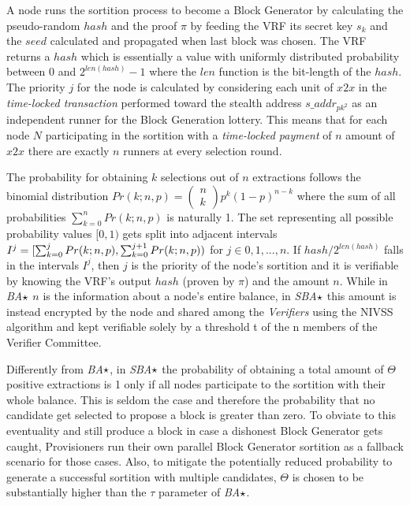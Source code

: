 A node runs the sortition process to become a Block Generator by
calculating the pseudo-random \(hash\) and the proof \(\pi\) by feeding
the VRF its secret key \(s_k\) and the \(seed\) calculated and
propagated when last block was chosen. The VRF returns a \(hash\) which
is essentially a value with uniformly distributed probability between 0
and \(2^{len(hash)} - 1\) where the \(len\) function is the bit-length
of the \(hash\). The priority \(j\) for the node is calculated by
considering each unit of \(x2x\) in the \emph{time-locked transaction}
performed toward the stealth address \(s\_addr_{pk^2}\) as an
independent runner for the Block Generation lottery. This means that for
each node \(N\) participating in the sortition with a \emph{time-locked
payment} of \(n\) amount of \(x2x\) there are exactly \(n\) runners at
every selection round.

The probability for obtaining \(k\) selections out of \(n\) extractions
follows the binomial distribution
\(Pr(k; n, p) = \left( \begin{array}{c} n \\ k \end{array} \right)p^k(1-p)^{n-k}\)
where the sum of all probabilities \(\sum_{k=0}^n Pr(k; n, p)\) is
naturally 1. The set representing all possible probability values
\([0, 1)\) gets split into adjacent intervals
\(I^j = [\space \sum_{k=0}^j Pr(k;n,p), \sum_{k=0}^{j+1} Pr(k;n,p)\space  )\)
for \(j \in {0, 1, ..., n}\). If \(hash/2^{len(hash)}\) falls in the
intervals \(I^j\), then \(j\) is the priority of the node's sortition
and it is verifiable by knowing the VRF's output \(hash\) (proven by
\(\pi\)) and the amount \(n\). While in \emph{BA}\(\large\star\) \(n\)
is the information about a node's entire balance, in
\emph{SBA}\(\large\star\) this amount is instead encrypted by the node
and shared among the \emph{Verifiers} using the NIVSS algorithm and kept
verifiable solely by a threshold t of the n members of the Verifier
Committee.

Differently from \emph{BA}\(\large\star\), in \emph{SBA}\(\large\star\)
the probability of obtaining a total amount of \(\Theta\) positive
extractions is 1 only if all nodes participate to the sortition with
their whole balance. This is seldom the case and therefore the
probability that no candidate get selected to propose a block is greater
than zero. To obviate to this eventuality and still produce a block in
case a dishonest Block Generator gets caught, Provisioners run their own
parallel Block Generator sortition as a fallback scenario for those
cases. Also, to mitigate the potentially reduced probability to generate
a successful sortition with multiple candidates, \(\Theta\) is chosen to
be substantially higher than the \(\tau\) parameter of
\emph{BA}\(\large\star\).

